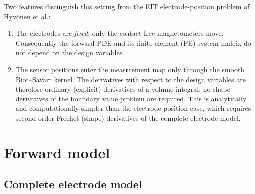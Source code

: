 \documentclass[11pt,a4paper]{article}
\begin{document}
Two features distinguish this setting from the EIT electrode-position problem of Hyv\"onen et al.:
\begin{enumerate}
  \item The electrodes are \emph{fixed}; only the contact-free magnetometers move. Consequently the
        forward PDE and its finite element (FE) system matrix do not depend on the design
        variables.
  \item The sensor positions enter the measurement map only through the smooth Biot--Savart
        kernel. The derivatives with respect to the design variables are therefore ordinary
        (explicit) derivatives of a volume integral; no shape derivatives of the boundary value
        problem are required. This is analytically and computationally simpler than the
        electrode-position case, which requires second-order Fr\'echet (shape) derivatives of the
        complete electrode model.
\end{enumerate}

\section{Forward model}

\subsection{Complete electrode model}
\end{document}
